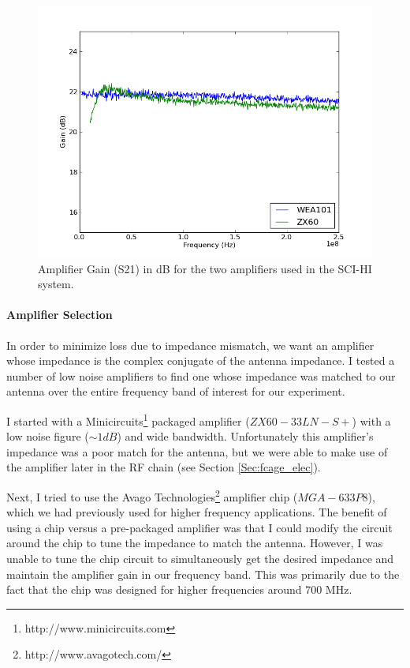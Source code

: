\begin{figure}[htb]
\begin{center}
\includegraphics[width=0.9\linewidth]{SCIHI_system/figures/amp_Gain_dB.png}
\caption{Amplifier Gain (S21) in dB for the two amplifiers used in the SCI-HI system. }
\label{Fig:amp_gain}
\end{center}
\end{figure}

\paragraph{Amplifier Selection}
In order to minimize loss due to impedance mismatch, we want an amplifier whose impedance is the complex conjugate of the antenna impedance. I tested a number of low noise amplifiers to find one whose impedance was matched to our antenna over the entire frequency band of interest for our experiment. 

I started with a Minicircuits\footnote{http://www.minicircuits.com} packaged amplifier ($ZX60 - 33 LN - S+$) with a low noise figure ($\sim 1 dB$) and wide bandwidth. Unfortunately this amplifier's impedance was a poor match for the antenna, but we were able to make use of the amplifier later in the RF chain (see Section \ref{Sec:fcage_elec}). 

Next, I tried to use the Avago Technologies\footnote{http://www.avagotech.com/} amplifier chip ($MGA-633P8$), which we had previously used for higher frequency applications. The benefit of using a chip versus a pre-packaged amplifier was that I could modify the circuit around the chip to tune the impedance to match the antenna. However, I was unable to tune the chip circuit to simultaneously get the desired impedance and maintain the amplifier gain in our frequency band. This was primarily due to the fact that the chip was designed for higher frequencies around 700 MHz. 

